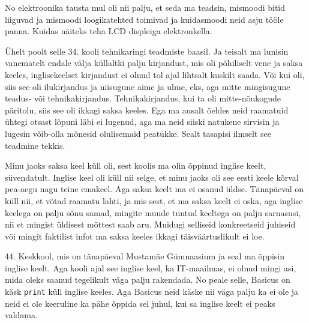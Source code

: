 No elektroonika tausta mul oli nii palju, et seda ma teadsin, mismoodi bitid 
liiguvad ja mismoodi  loogikatehted toimivad ja kuidasmoodi neid asju tööle panna. 
Kuidas näiteks teha LCD displeiga elektronkella.  


Ühelt poolt selle 34. kooli tehnikaringi teadmiste baasil. Ja teisalt ma lunisin vanematelt 
endale välja küllaltki palju kirjandust, mis oli põhiliselt vene ja saksa 
keeles, inglisekeelset kirjandust ei olnud tol ajal lihtsalt kuskilt saada. Või 
kui oli, siis see oli ilukirjandus ja niisugune aime ja ulme, eks, aga mitte 
mingisugune teadus- või tehnikakirjandus. Tehnikakirjandus, kui ta oli 
mitte-nõukogude päritolu, siis see oli ikkagi saksa keeles. Ega ma ausalt öeldes 
neid raamatuid ühtegi otsast lõpuni läbi ei lugenud, aga ma neid siiski 
natukene sirvisin ja  lugesin võib-olla mõnesid olulisemaid peatükke. Sealt 
tasapisi ilmselt see teadmine tekkis.


Minu jaoks saksa keel küll oli, sest koolis ma olin õppinud inglise keelt, 
süvendatult. Inglise keel oli küll nii selge, et minu jaoks oli see eesti keele 
kõrval  pea-aegu nagu teine emakeel. Aga saksa keelt ma ei osanud üldse. 
Tänapäeval on küll nii, et võtad raamatu lahti, ja mis sest, et ma saksa 
keelt ei oska, aga  inglise keelega on palju sõnu samad, mingite muude tuntud 
keeltega on palju sarnasusi, nii et mingist üldisest mõttest saab aru. Muidugi 
selliseid konkreetseid juhiseid või mingit faktilist infot ma saksa keeles 
ikkagi täisväärtuslikult ei loe. 


44. Keskkool, mis on tänapäeval Mustamäe 
Gümnaasium 
ja seal ma õppisin inglise keelt. Aga kooli ajal see inglise keel, ka 
IT-maailmas, ei olnud mingi asi, mida oleks saanud tegelikult väga palju rakendada. No 
peale selle, Basicus on käsk \verb|print| küll inglise keeles. Aga 
Basicus neid käske nii väga palju ka ei ole ja neid ei ole keeruline ka pähe 
õppida sel juhul, kui sa inglise keelt ei peaks valdama. 


